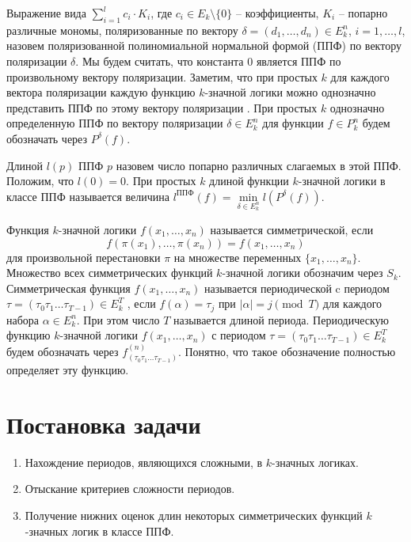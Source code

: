 \documentclass[bibliography=totoc, a4paper, 12pt]{extarticle}
\let\stdsection\section
\renewcommand\section{\newpage\stdsection}
\begin{document}
Выражение вида $\sum\limits_{i=1}^lc_i \cdot K_i$, где $c_i \in
E_k\setminus\{0\}$ -- коэффициенты, $K_i$ -- попарно различные мономы,
поляризованные по вектору $\delta = (d_1, \dots, d_n) \in E_k^n$, $i = 1, \dots,
l$, назовем поляризованной полиномиальной нормальной формой (ППФ) по вектору
поляризации $\delta$. Мы будем считать, что константа 0 является ППФ по
произвольному вектору поляризации. Заметим, что при простых $k$ для каждого
вектора поляризации каждую функцию $k$\nobreakdash-значной логики можно
однозначно представить ППФ по этому вектору поляризации \cite{ss02}. При простых
$k$ однозначно определенную ППФ по вектору поляризации $\delta \in E_k^n$ для
функции $f \in P_k^n$ будем обозначать через $P^{\delta}(f)$.

Длиной $l(p)$ ППФ $p$ назовем число попарно различных слагаемых в этой ППФ.
Положим, что $l(0) = 0$. При простых $k$ длиной функции $k$\nobreakdash-значной
логики в классе ППФ называется величина $l^{\text{ППФ}}(f) = \min\limits_{\delta
\in E_k^n}l(P^{\delta}(f))$.

Функция $k$\nobreakdash-значной логики $f(x_1 ,\dots , x_n)$ называется
симметрической, если $$f(\pi(x_1), \dots, \pi(x_n)) = f(x_1, \dots, x_n)$$ для
произвольной перестановки $\pi$ на множестве переменных $\{x_1 , \dots , x_n \}$.
Множество всех симметрических функций $k$\nobreakdash-значной логики обозначим
через $S_k$. Симметрическая функция $f(x_1, \dots, x_n)$ называется
периодической c периодом $\tau = (\tau_0 \tau_1 \dots \tau_{T-1}) \in E_k^T$ ,
если $f(\alpha) = \tau_j$ при $|\alpha| = j \pmod T$ для каждого набора $\alpha
\in E_k^n$. При этом число $T$ называется длиной периода. Периодическую функцию
$k$\nobreakdash-значной логики $f(x_1 , \dots , x_n)$ с периодом $\tau = (\tau_0
\tau_1 \dots \tau_{T-1}) \in E_k^T$ будем обозначать через $f^{(n)}_{(\tau_0
\tau_1 \dots \tau_{T-1})}$. Понятно, что такое обозначение полностью определяет
эту функцию.

\section{Постановка задачи}
\begin{enumerate}
\item Нахождение периодов, являющихся сложными, в $k$-значных логиках.

\item Отыскание критериев сложности периодов.

\item Получение нижних оценок длин некоторых симметрических функций $k$-значных
логик в классе ППФ.
\end{enumerate}
\end{document}
